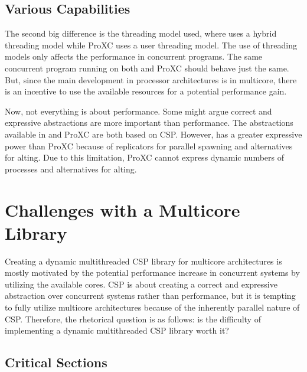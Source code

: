 \section{Various Capabilities}


The second big difference is the threading model used, where \Proxc{} uses a hybrid threading model while ProXC uses a user threading model. The use of threading models only affects the performance in concurrent programs. The same concurrent program running on both \Proxc{} and ProXC should behave just the same. But, since the main development in processor architectures is in multicore, there is an incentive to use the available resources for a potential performance gain.

Now, not everything is about performance. Some might argue correct and expressive abstractions are more important than performance. The abstractions available in \Proxc{} and ProXC are both based on CSP. However, \Proxc{} has a greater expressive power than ProXC because of replicators for parallel spawning and alternatives for alting. Due to this limitation, ProXC cannot express dynamic numbers of processes and alternatives for alting.


\chapter{Challenges with a Multicore Library}
\label{ch:difficulty_multicore_csp}

Creating a dynamic multithreaded CSP library for multicore architectures is mostly motivated by the potential performance increase in concurrent systems by utilizing the available cores. CSP is about creating a correct and expressive abstraction over concurrent systems rather than performance, but it is tempting to fully utilize multicore architectures because of the inherently parallel nature of CSP. Therefore, the rhetorical question is as follows: is the difficulty of implementing a dynamic multithreaded CSP library worth it?


\section{Critical Sections}


